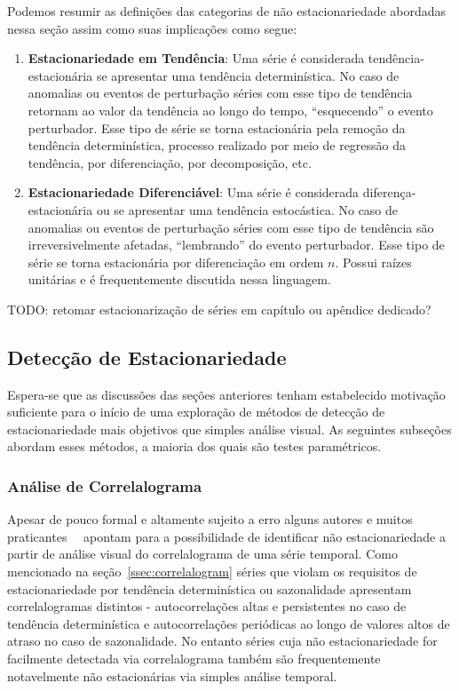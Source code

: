Podemos resumir as definições das categorias de não estacionariedade abordadas
nessa seção assim como suas implicações como segue:

\begin{enumerate}
    \item \textbf{Estacionariedade em Tendência}: Uma série é considerada
        tendência-estacionária se apresentar uma tendência determinística. No
        caso de anomalias ou eventos de perturbação séries com esse tipo de
        tendência retornam ao valor da tendência ao longo do tempo,
        ``esquecendo'' o evento perturbador. Esse tipo de série se torna
        estacionária pela remoção da tendência determinística, processo
        realizado por meio de regressão da tendência, por diferenciação, por
        decomposição, etc.
    \item \textbf{Estacionariedade Diferenciável}: Uma série é considerada
        diferença-estacionária ou se apresentar uma tendência estocástica. No
        caso de anomalias ou eventos de perturbação séries com esse tipo de
        tendência são irreversivelmente afetadas,
        ``lembrando'' do evento perturbador. Esse tipo de série se torna
        estacionária por diferenciação em ordem $n$. Possui raízes unitárias
        e é frequentemente discutida nessa linguagem.

\end{enumerate}

TODO: retomar estacionarização de séries em capítulo ou apêndice dedicado?

\subsection{Detecção de Estacionariedade}\label{ssec:stationarity_tests}

Espera-se que as discussões das seções anteriores tenham estabelecido motivação
suficiente para o início de uma exploração de métodos de detecção de
estacionariedade mais objetivos que simples análise visual. As seguintes
subseções abordam esses métodos, a maioria dos quais são testes paramétricos.

\subsubsection{Análise de Correlalograma}

Apesar de pouco formal e altamente sujeito a erro alguns autores e muitos
praticantes~\cite{chatfield}~\cite{metcalfe} apontam para a possibilidade de
identificar não estacionariedade a partir de análise visual do correlalograma
de uma série temporal. Como mencionado na seção~\ref{ssec:correlalogram}
séries que violam os requisitos de estacionariedade por tendência
determinística ou sazonalidade apresentam correlalogramas distintos -
autocorrelações altas e persistentes no caso de tendência determinística e
autocorrelações periódicas ao longo de valores altos de atraso no caso de
sazonalidade. No entanto séries cuja não estacionariedade for facilmente
detectada via correlalograma também são frequentemente notavelmente não
estacionárias via simples análise temporal.

